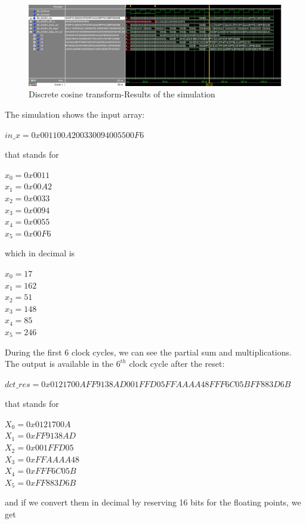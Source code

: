 \begin{figure}[h!]
	\centering	
	\includegraphics[width=\textwidth]{imm/dct/wave1.png}  
	\caption{Discrete cosine transform-Results of the simulation} 
	\label{fig:tb_dct}
\end{figure}
The simulation shows the input array:
\begin{center}
	$ in\_x=0x001100A200330094005500F6$ 
\end{center}
that stands for 
\begin{center}
	$ x_{0}=0x0011$\\
$ 	x_{1}=0x00A2 $\\
	$ x_{2}=0x0033 $ \\
	$ x_{3}=0x0094 $ \\
	$ x_{4}=0x0055 $ \\
	$x_{5}=0x00F6$
\end{center} which in decimal is
\begin{center}

$ x_{0}=17$ \\$ x_{1}=162 $\\$ x_{2}=51 $\\$ x_{3}=148 $\\$ x_{4}=85 $\\$x_{5}=246$
\end{center}
During the first 6 clock cycles, we can see the partial sum and multiplications.
The output is available in the $ 6^{th} $ clock cycle after the reset:\begin{center}
	 $ dct\_res=0x0121700AFF9138AD001FFD05FFAAAA48FFF6C05BFF883D6B $
\end{center} that stands for\begin{center}
 $ X_{0}=0x0121700A$ \\$X_{1}=0xFF9138AD$\\$X_{2}=0x001FFD05$\\$X_{3}=0xFFAAAA48
 $\\$X_{4}=0xFFF6C05B$\\$X_{5}=0xFF883D6B $
\end{center} and if we convert them in decimal by reserving 16 bits for the floating points, we get 
